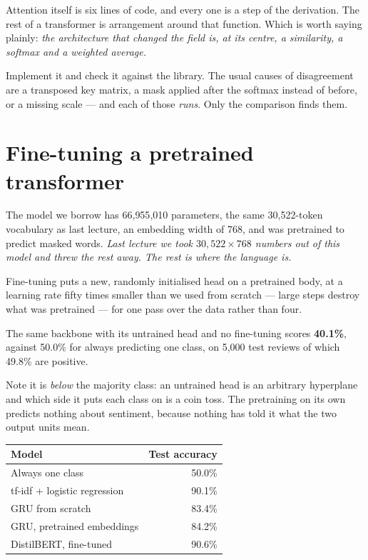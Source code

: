 \documentclass[11pt,a4paper]{article}
\begin{document}
Attention itself is six lines of code, and every one is a step of the
derivation. The rest of a transformer is arrangement around that function.
Which is worth saying plainly: \emph{the architecture that changed the field is,
at its centre, a similarity, a softmax and a weighted average.}

Implement it and check it against the library. The usual causes of
disagreement are a transposed key matrix, a mask applied after the softmax
instead of before, or a missing scale --- and each of those \emph{runs}. Only
the comparison finds them.

\section{Fine-tuning a pretrained transformer}

The model we borrow has 66{,}955{,}010 parameters, the same 30{,}522-token
vocabulary as last lecture, an embedding width of 768, and was pretrained to
predict masked words. \emph{Last lecture we took $30{,}522\times768$ numbers out
of this model and threw the rest away. The rest is where the language is.}

Fine-tuning puts a new, randomly initialised head on a pretrained body, at a
learning rate fifty times smaller than we used from scratch --- large steps
destroy what was pretrained --- for one pass over the data rather than four.

\begin{keybox}[title={How much is the head, and how much is the body?}]
The same backbone with its untrained head and no fine-tuning scores
\textbf{40.1\%}, against 50.0\% for always predicting one class, on 5{,}000 test
reviews of which 49.8\% are positive.

Note it is \emph{below} the majority class: an untrained head is an arbitrary
hyperplane and which side it puts each class on is a coin toss. The pretraining
on its own predicts nothing about sentiment, because nothing has told it what
the two output units mean.
\end{keybox}

\begin{center}
\small
\begin{tabular}{lr}
\toprule
\textbf{Model} & \textbf{Test accuracy} \\
\midrule
Always one class & 50.0\% \\
tf-idf + logistic regression & 90.1\% \\
GRU from scratch & 83.4\% \\
GRU, pretrained embeddings & 84.2\% \\
DistilBERT, fine-tuned & 90.6\% \\
\bottomrule
\end{tabular}
\end{center}
\end{document}
